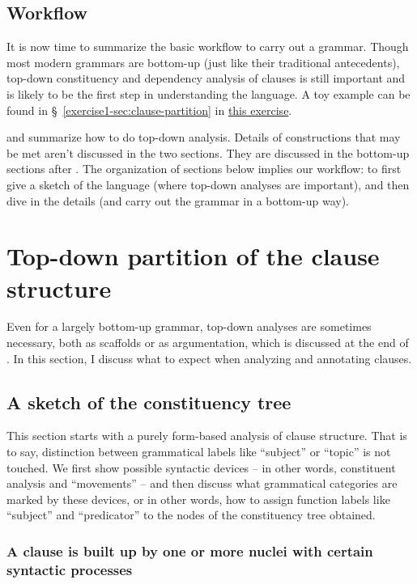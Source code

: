 \documentclass[UTF8, a4paper, oneside, scheme=plain]{ctexart}
\newcommand*{\citesec}[1]{\S~{#1}}
\newcommand{\exerciseone}{\href{../Exercise/2021-3.pdf}{this exercise}}
\begin{document}
\subsection{Workflow}

It is now time to summarize the basic workflow to carry out a grammar.
Though most modern grammars are bottom-up (just like their traditional antecedents),
top-down constituency and dependency analysis of clauses is still important
and is likely to be the first step in understanding the language.
A toy example can be found in \citesec{\ref{exercise1-sec:clause-partition}} in \exerciseone.

 and  summarize 
how to do top-down analysis.
Details of constructions that may be met aren't discussed in the two sections.
They are discussed in the bottom-up sections after .
The organization of sections below implies our workflow:
to first give a sketch of the language (where top-down analyses are important),
and then dive in the details (and carry out the grammar in a bottom-up way).

\section{Top-down partition of the clause structure}\label{sec:clause-top-down}

Even for a largely bottom-up grammar,
top-down analyses are sometimes necessary,
both as scaffolds or as argumentation,
which is discussed at the end of .
In this section, I discuss what to expect when analyzing and annotating clauses.

\subsection{A sketch of the constituency tree}\label{sec:ica-clause}

This section starts with a purely form-based analysis of clause structure.
That is to say, distinction between grammatical labels like ``subject'' or ``topic''
is not touched.
We first show possible syntactic devices 
-- in other words, constituent analysis and ``movements'' --
and then discuss what grammatical categories are marked by these devices,
or in other words, 
how to assign function labels like ``subject'' and ``predicator''
to the nodes of the constituency tree obtained.

\subsubsection{A clause is built up by one or more nuclei with certain syntactic processes}\label{sec:nucleus-to-clause}
\end{document}
